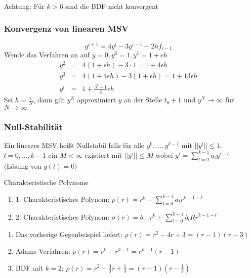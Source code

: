 Achtung: Für $k>6$ sind die BDF nicht konvergent

\subsubsection{Konvergenz von linearen MSV}

\begin{example}
$$y^{i+1}=4y^{i}-3y^{i-1}-2hf_{i-1}$$
Wende das Verfahren an auf $\dot y =0,y^{0}=1,y^{1}=1+\epsilon h$
\begin{eqnarray*}
	y^{2}&=&4(1+\epsilon h)-3\cdot 1 = 1+4\epsilon h\\
	y^{3}&=&4(1+4\epsilon h)-3(1+\epsilon h) = 1+13\epsilon h\\
	y^{i}&=&1+\frac{3^{i}-1}{2}\epsilon h
\end{eqnarray*}
Sei $h=\frac{1}{N}$, dann gilt $y^{N}$ approximiert $y$ an der Stelle $t_{0}+1$ und $y^{N}\rightarrow \infty$ für $N\rightarrow \infty$
\end{example}

\subsubsection{Null-Stabilität}
\begin{definition}
	[Definition IV.8] Ein lineares MSV heißt Nullstabil falls für alle $y^{0},\ldots,y^{k-1}$ mit $||y^{l}||\le 1$, $l=0,\ldots,k-1$ ein
	$M<\infty$ existiert mit $||y^{i}||\le M$ wobei $y^{i}=\sum_{l=0}^{k-1}a_{l}y^{i-l}$ (Lösung von $\dot y(t)=0$)
\end{definition}

\begin{definition}
	[Definition IV.9] Charakteristische Polynome
	\\
	\begin{enumerate}
		\item 1. Charakteristisches Polynom: $\rho(r)=r^{k}-\sum_{l=0}^{k-1}a_{l}r^{k-1-l}$
		\item 2. Charakteristisches Polynom: $\sigma(r)=b_{-1}r^{k}+\sum_{l=0}^{k-1}b_{l}Rr^{k-1-l}$
	\end{enumerate}
\end{definition}


\begin{example}
	\begin{enumerate}
		\item Das vorherige Gegenbeispiel liefert: $\rho(r)=r^{2}-4r+3=(r-1)(r-3)$
		\item Adams-Verfahren: $\rho(r)=r^{k}-r^{k-1}=r^{k-1}(r-1)$
		\item BDF mit $k=2$: $\rho(r)=r^{2}-\frac{4}{3}r+\frac{1}{3} = (r-1)(r-\frac{1}{3})$
	\end{enumerate}
\end{example}

